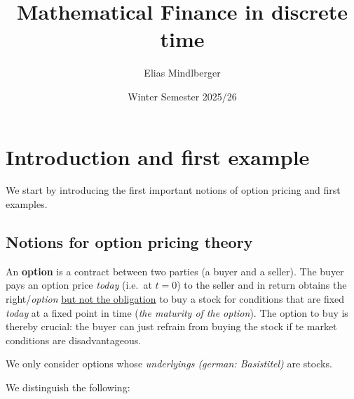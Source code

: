 \documentclass[12pt]{amsart}
\title{Mathematical Finance in discrete time}
\author{Elias Mindlberger}
\date{Winter Semester 2025/26}
\begin{document}
\maketitle

\tableofcontents
\bigskip

\section{Introduction and first example}

We start by introducing the first important notions of option pricing and first examples.

\subsection{Notions for option pricing theory}

An \textbf{option} is a contract between two parties (a buyer and a seller). The buyer pays an option price \emph{today} (i.e.\ at \(t=0\)) to the seller and in return obtains the right/\emph{option} \underline{but not the obligation} to buy a stock for conditions that are fixed \emph{today} at a fixed point in time (\emph{the maturity of the option}).
The option to buy is thereby crucial: the buyer can just refrain from buying the stock if te market conditions are disadvantageous.

We only consider options whose \emph{underlyings (german: Basistitel)} are stocks.\newpage

We distinguish the following:

\end{document}
